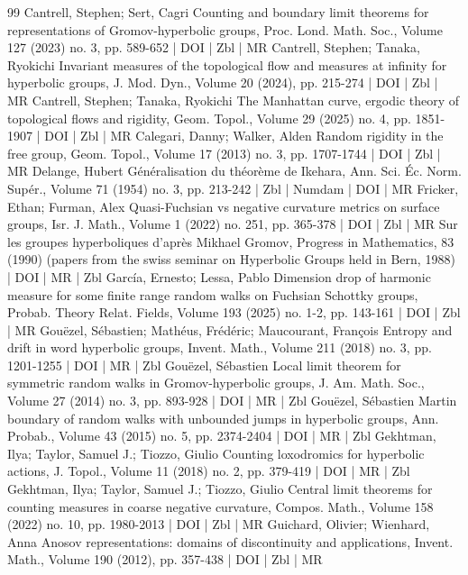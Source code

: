 \documentclass[10pt]{amsart}
\theoremstyle{definition}\newtheorem{defi}[theo]{Definition}\newtheorem{rema}[theo]{Remark}\newtheorem{exam}[theo]{Example}\newtheorem{exem}[theo]{Example}\newtheorem{nota}[theo]{Notation}
\theoremstyle{plain}
\begin{document}
\begin{thebibliography}{99}
 Cantrell, Stephen; Sert, Cagri Counting and boundary limit theorems for representations of Gromov-hyperbolic groups, Proc. Lond. Math. Soc., Volume 127 (2023) no. 3, pp. 589-652 | DOI | Zbl | MR
 Cantrell, Stephen; Tanaka, Ryokichi Invariant measures of the topological flow and measures at infinity for hyperbolic groups, J. Mod. Dyn., Volume 20 (2024), pp. 215-274 | DOI | Zbl | MR
 Cantrell, Stephen; Tanaka, Ryokichi The Manhattan curve, ergodic theory of topological flows and rigidity, Geom. Topol., Volume 29 (2025) no. 4, pp. 1851-1907 | DOI | Zbl | MR
 Calegari, Danny; Walker, Alden Random rigidity in the free group, Geom. Topol., Volume 17 (2013) no. 3, pp. 1707-1744 | DOI | Zbl | MR
 Delange, Hubert Généralisation du théorème de Ikehara, Ann. Sci. Éc. Norm. Supér., Volume 71 (1954) no. 3, pp. 213-242 | Zbl | Numdam | DOI | MR
 Fricker, Ethan; Furman, Alex Quasi-Fuchsian vs negative curvature metrics on surface groups, Isr. J. Math., Volume 1 (2022) no. 251, pp. 365-378 | DOI | Zbl | MR
 Sur les groupes hyperboliques d’après Mikhael Gromov, Progress in Mathematics, 83 (1990) (papers from the swiss seminar on Hyperbolic Groups held in Bern, 1988) | DOI | MR | Zbl
 García, Ernesto; Lessa, Pablo Dimension drop of harmonic measure for some finite range random walks on Fuchsian Schottky groups, Probab. Theory Relat. Fields, Volume 193 (2025) no. 1-2, pp. 143-161 | DOI | Zbl | MR
 Gouëzel, Sébastien; Mathéus, Frédéric; Maucourant, François Entropy and drift in word hyperbolic groups, Invent. Math., Volume 211 (2018) no. 3, pp. 1201-1255 | DOI | MR | Zbl
 Gouëzel, Sébastien Local limit theorem for symmetric random walks in Gromov-hyperbolic groups, J. Am. Math. Soc., Volume 27 (2014) no. 3, pp. 893-928 | DOI | MR | Zbl
 Gouëzel, Sébastien Martin boundary of random walks with unbounded jumps in hyperbolic groups, Ann. Probab., Volume 43 (2015) no. 5, pp. 2374-2404 | DOI | MR | Zbl
 Gekhtman, Ilya; Taylor, Samuel J.; Tiozzo, Giulio Counting loxodromics for hyperbolic actions, J. Topol., Volume 11 (2018) no. 2, pp. 379-419 | DOI | MR | Zbl
 Gekhtman, Ilya; Taylor, Samuel J.; Tiozzo, Giulio Central limit theorems for counting measures in coarse negative curvature, Compos. Math., Volume 158 (2022) no. 10, pp. 1980-2013 | DOI | Zbl | MR
 Guichard, Olivier; Wienhard, Anna Anosov representations: domains of discontinuity and applications, Invent. Math., Volume 190 (2012), pp. 357-438 | DOI | Zbl | MR

\end{thebibliography}
\end{document}
